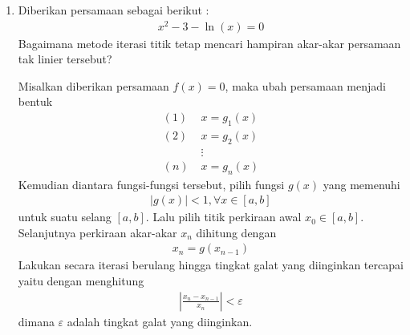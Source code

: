 \documentclass[12pt]{article}
\begin{document}
\begin{enumerate}
    \item {
        Diberikan persamaan sebagai berikut :
        \begin{align*}
            x^2 - 3 - \ln(x) = 0 
        \end{align*}
        Bagaimana metode iterasi titik tetap mencari hampiran akar-akar persamaan tak linier tersebut? \bigskip

        Misalkan diberikan persamaan $ f(x) = 0 $, maka ubah persamaan menjadi bentuk
        \begin{align*}
            (1)\;   & x = g_1(x) \\
            (2)\;   & x = g_2(x) \\
                    & \vdots \\
            (n)\;   & x = g_n(x)
        \end{align*}
        Kemudian diantara fungsi-fungsi tersebut, pilih fungsi $ g(x) $ yang memenuhi
        \begin{align*}
            |g(x)| < 1, \forall x \in [a,b]
        \end{align*}
        untuk suatu selang $ [a,b] $. Lalu pilih titik perkiraan awal $ x_0 \in [a,b]$. Selanjutnya perkiraan akar-akar $ x_n $ dihitung dengan
        \begin{align*}
            x_n = g(x_{n-1})
        \end{align*} 
        Lakukan secara iterasi berulang hingga tingkat galat yang diinginkan tercapai yaitu dengan menghitung
        \begin{align*}
            \left|\frac{x_n - x_{n-1}}{x_n}\right| < \varepsilon
        \end{align*}
        dimana $ \varepsilon $ adalah tingkat galat yang diinginkan.\bigskip

}
\end{enumerate}
\end{document}
